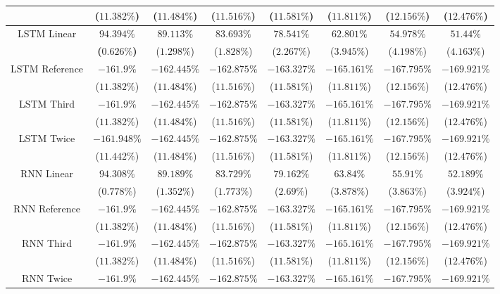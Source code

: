 \begin{table}[!ht]
{\begin{tabular}{|c|c|c|c|c|c|c|c|}
			 & ($11.382\%$) & ($11.484\%$) & ($11.516\%$) & ($11.581\%$) & ($11.811\%$) & ($12.156\%$) & ($12.476\%$) \\ \hline
			\multirow{2}{*}{LSTM Linear} & $\mathbf{94.394\%}$ & $89.113\%$ & $83.693\%$ & $78.541\%$ & $62.801\%$ & $54.978\%$ & $51.44\%$ \\
			 & \textbf{(}$\mathbf{0.626\%}$\textbf{)} & ($1.298\%$) & ($1.828\%$) & ($2.267\%$) & ($3.945\%$) & ($4.198\%$) & ($4.163\%$) \\ \hline
			\multirow{2}{*}{LSTM Reference} & $-161.9\%$ & $-162.445\%$ & $-162.875\%$ & $-163.327\%$ & $-165.161\%$ & $-167.795\%$ & $-169.921\%$ \\
			 & ($11.382\%$) & ($11.484\%$) & ($11.516\%$) & ($11.581\%$) & ($11.811\%$) & ($12.156\%$) & ($12.476\%$) \\ \hline
			\multirow{2}{*}{LSTM Third} & $-161.9\%$ & $-162.445\%$ & $-162.875\%$ & $-163.327\%$ & $-165.161\%$ & $-167.795\%$ & $-169.921\%$ \\
			 & ($11.382\%$) & ($11.484\%$) & ($11.516\%$) & ($11.581\%$) & ($11.811\%$) & ($12.156\%$) & ($12.476\%$) \\ \hline
			\multirow{2}{*}{LSTM Twice} & $-161.948\%$ & $-162.445\%$ & $-162.875\%$ & $-163.327\%$ & $-165.161\%$ & $-167.795\%$ & $-169.921\%$ \\
			 & ($11.442\%$) & ($11.484\%$) & ($11.516\%$) & ($11.581\%$) & ($11.811\%$) & ($12.156\%$) & ($12.476\%$) \\ \hline
			\multirow{2}{*}{RNN Linear} & $94.308\%$ & $89.189\%$ & $83.729\%$ & $79.162\%$ & $63.84\%$ & $55.91\%$ & $52.189\%$ \\
			 & ($0.778\%$) & ($1.352\%$) & ($1.773\%$) & ($2.69\%$) & ($3.878\%$) & ($3.863\%$) & ($3.924\%$) \\ \hline
			\multirow{2}{*}{RNN Reference} & $-161.9\%$ & $-162.445\%$ & $-162.875\%$ & $-163.327\%$ & $-165.161\%$ & $-167.795\%$ & $-169.921\%$ \\
			 & ($11.382\%$) & ($11.484\%$) & ($11.516\%$) & ($11.581\%$) & ($11.811\%$) & ($12.156\%$) & ($12.476\%$) \\ \hline
			\multirow{2}{*}{RNN Third} & $-161.9\%$ & $-162.445\%$ & $-162.875\%$ & $-163.327\%$ & $-165.161\%$ & $-167.795\%$ & $-169.921\%$ \\
			 & ($11.382\%$) & ($11.484\%$) & ($11.516\%$) & ($11.581\%$) & ($11.811\%$) & ($12.156\%$) & ($12.476\%$) \\ \hline
			\multirow{2}{*}{RNN Twice} & $-161.9\%$ & $-162.445\%$ & $-162.875\%$ & $-163.327\%$ & $-165.161\%$ & $-167.795\%$ & $-169.921\%$ \\

\end{tabular}}
\end{table}
